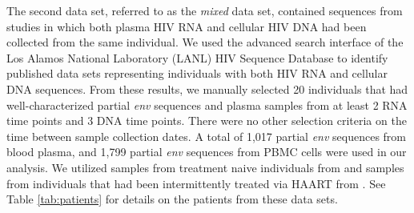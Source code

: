 \documentclass[12pt]{article}
\begin{document}
The second data set, referred to as the {\em mixed} data set, contained sequences from studies in which both plasma HIV RNA and cellular HIV DNA had been collected from the same individual.
We used the advanced search interface of the Los Alamos National Laboratory (LANL) HIV Sequence Database \cite{LosAlamos} to identify published data sets representing individuals with both HIV RNA and cellular DNA sequences.
From these results, we manually selected 20 individuals that had well-characterized partial {\em env} sequences and plasma samples from at least 2 RNA time points and 3 DNA time points. 
There were no other selection criteria on the time between sample collection dates. 
A total of 1,017 partial {\em env} sequences from blood plasma, and 1,799 partial {\em env} sequences from PBMC cells were used in our analysis. 
We utilized samples from treatment naive individuals from \cite{Shankarappa99, Novitsky09} and samples from individuals that had been intermittently treated via HAART from \cite{Llewellyn06,Fischer04}. 
See Table \ref{tab:patients} for details on the patients from these data sets.
\end{document}
